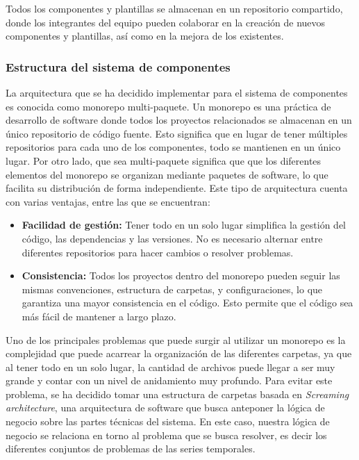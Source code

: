 Todos los componentes y plantillas se almacenan en un repositorio
compartido, donde los integrantes del equipo pueden colaborar en la
creación de nuevos componentes y plantillas, así como en la mejora de
los existentes.

\subsubsection{Estructura del sistema de componentes}
La arquitectura que se ha decidido implementar para el sistema de componentes
es conocida como monorepo multi-paquete. Un monorepo es una práctica de 
desarrollo de software donde todos los proyectos relacionados 
se almacenan en un único repositorio de código fuente. Esto significa que en 
lugar de tener múltiples repositorios para cada uno de los componentes, todo se 
mantienen en un único lugar. Por otro lado, que sea multi-paquete significa que
que los diferentes elementos del monorepo se organizan mediante paquetes de
software, lo que facilita su distribución de forma independiente. Este tipo de 
arquitectura cuenta con varias ventajas, entre las que se encuentran:

\begin{itemize}
    \item \textbf{Facilidad de gestión:} Tener todo en un solo lugar simplifica la gestión 
    del código, las dependencias y las versiones. No es necesario alternar entre
    diferentes repositorios para hacer cambios o resolver problemas.
    \item \textbf{Consistencia:} Todos los proyectos dentro del monorepo pueden seguir 
    las mismas convenciones, estructura de carpetas, y configuraciones, 
    lo que garantiza una mayor consistencia en el código. Esto permite que el código
    sea más fácil de mantener a largo plazo.
\end{itemize}

Uno de los principales problemas que puede surgir al utilizar un monorepo es la
complejidad que puede acarrear la organización de las diferentes carpetas, ya
que al tener todo en un solo lugar, la cantidad de archivos puede llegar
a ser muy grande y contar con un nivel de anidamiento muy profundo. Para evitar este
problema, se ha decidido tomar una estructura de carpetas basada en 
\textit{Screaming architecture}, una arquitectura de software que busca anteponer la
lógica de negocio sobre las partes técnicas del sistema. En este caso, nuestra lógica de
negocio se relaciona en torno al problema que se busca resolver, es decir los diferentes 
conjuntos de problemas de las series temporales.\medskip

